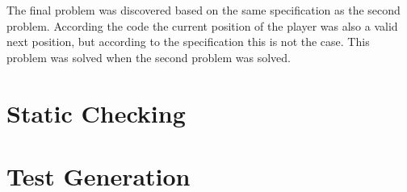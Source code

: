 \documentclass[a4paper]{article}
\begin{document}
	The final problem was discovered based on the same specification as the second problem. According the code the current position of the player was also a valid next position, but according to the specification this is not the case. This problem was solved when the second problem was solved.
	
	\section{Static Checking}
	
	
	\section{Test Generation}
	
	
	
\end{document}
